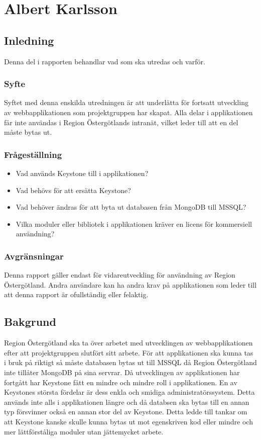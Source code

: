 \section{Albert Karlsson}
\subsection{Inledning}
Denna del i rapporten behandlar vad som ska utredas och varför.
\subsubsection{Syfte}
Syftet med denna enskilda utredningen är att underlätta för fortsatt utveckling av webbapplikationen som projektgruppen har skapat. Alla delar i applikationen får inte användas i Region Östergötlands intranät, vilket leder till att en del måste bytas ut.
\subsubsection{Frågeställning}
\begin{itemize}
\item Vad används Keystone till i applikationen?
\item Vad behövs för att ersätta Keystone?
\item Vad behöver ändras för att byta ut databasen från MongoDB till MSSQL?
\item Vilka moduler eller bibliotek i applikationen kräver en licens för kommersiell användning?

\end{itemize}
\subsubsection{Avgränsningar}
Denna rapport gäller endast för vidareutveckling för användning av Region Östergötland. Andra användare kan ha andra krav på applikationen som leder till att denna rapport är ofullständig eller felaktig. 
\subsection{Bakgrund}
Region Östergötland ska ta över arbetet med utvecklingen av webbapplikationen efter att projektgruppen slutfört sitt arbete. För att applikationen ska kunna tas i bruk på riktigt så måste databasen bytas ut till MSSQL då Region Östergötland inte tillåter MongoDB på sina servrar. Då utvecklingen av applikationen har fortgått har Keystone fått en mindre och mindre roll i applikationen. En av Keystones största fördelar är dess enkla och smidiga administratörssystem. Detta används inte alls i applikationen längre och då databsen ska bytas till en annan typ försvinner också en annan stor del av Keystone. Detta ledde till tankar om att Keystone kanske skulle kunna bytas ut mot egenskriven kod eller mindre och mer lättförståliga moduler utan jättemycket arbete.
